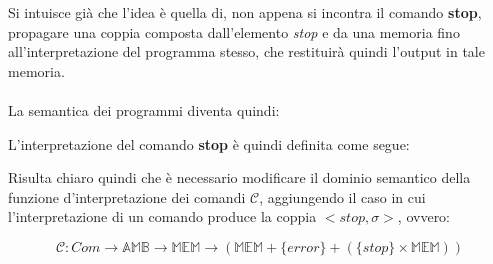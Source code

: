     Si intuisce già che l'idea è quella di, non appena si incontra il comando \textbf{stop}, propagare una coppia composta dall'elemento \textit{stop} e da una memoria fino all'interpretazione del programma stesso, che restituirà quindi l'output in tale memoria.\\
    \\
    La semantica dei programmi diventa quindi:
    
    
    L'interpretazione del comando \textbf{stop} è quindi definita come segue:
    
    
    Risulta chiaro quindi che è necessario modificare il dominio semantico della funzione d'interpretazione dei comandi $\mathcal{C}$, aggiungendo il caso in cui l'interpretazione di un comando produce la coppia $<stop,\sigma>$, ovvero:
    
    \begin{equation*}
        \mathcal{C} : Com \rightarrow \mathbb{AMB} \rightarrow \mathbb{MEM} \rightarrow (\mathbb{MEM} + \{error\} + (\{stop\} \times \mathbb{MEM}))
    \end{equation*}
    
